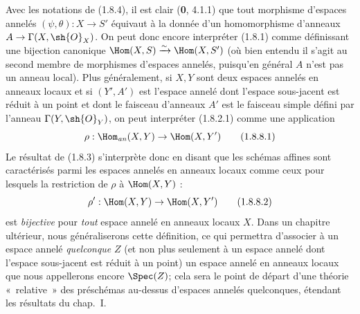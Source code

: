 \begin{env}[1.8.8]
\label{ega2:addendum:I.1.8.8-fr}
Avec les notations de (1.8.4), il est clair (\textbf{0}, 4.1.1) que tout
morphisme d'espaces annelés $(\psi,\theta):X\to S'$ équivaut à la
donnée d'un homomorphisme d'anneaux
$A\to\Gamma(X,\sh{O}_X)$. On peut donc encore interpréter (1.8.1)
comme définissant une bijection canonique
$\Hom(X,S)\xrightarrow{\sim}\Hom(X,S')$
(où bien entendu il s'agit au second membre de morphismes d'espaces
annelés, puisqu'en général $A$ n'est pas un anneau local). Plus
généralement, si $X,Y$ sont deux espaces annelés en anneaux locaux et
si $(Y',A')$ est l'espace annelé dont l'espace sous-jacent est réduit à
un point et dont le faisceau d'anneaux $A'$ est le faisceau simple
défini par l'anneau $\Gamma(Y,\sh{O}_Y)$, on peut interpréter
(1.8.2.1) comme une application
\begin{equation}
\label{ega2:addendum:I.1.8.8.1-fr}
  \rho:\Hom_{\mathit{an}}(X,Y)\to\Hom(X,Y')
\tag{1.8.8.1}
\end{equation}
Le résultat de (1.8.3) s'interprète donc en disant que les schémas
affines sont caractérisés parmi les espaces annelés en anneaux locaux
comme ceux pour lesquels la restriction de $\rho$ à $\Hom(X,Y)$ :
\begin{equation}
\label{ega2:addendum:I.1.8.8.2-fr}
  \rho':\Hom(X,Y)\to\Hom(X,Y')
\tag{1.8.8.2}
\end{equation}
est \emph{bijective} pour \emph{tout} espace annelé en anneaux locaux $X$. Dans un
chapitre ultérieur, nous généraliserons cette définition, ce qui
permettra d'associer à un espace annelé \emph{quelconque} $Z$ (et non plus
seulement à un espace annelé dont l'espace sous-jacent est réduit à un
point) un espace annelé en anneaux locaux que nous appellerons encore
$\Spec(Z)$; cela sera le point de départ d'une théorie «~relative~» des
préschémas au-dessus d'espaces annelés quelconques, étendant les
résultats du chap.~I.
\end{env}

